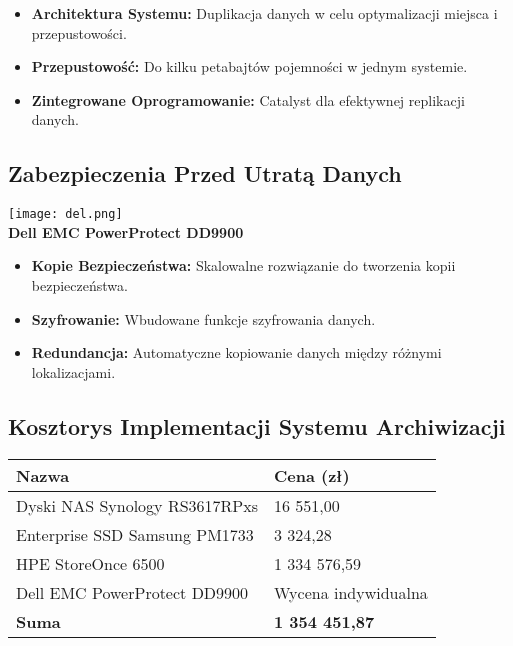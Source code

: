             \begin{itemize}
                \item \textbf{Architektura Systemu:} Duplikacja danych w celu optymalizacji miejsca i przepustowości.
                \item \textbf{Przepustowość:} Do kilku petabajtów pojemności w jednym systemie.
                \item \textbf{Zintegrowane Oprogramowanie:} Catalyst dla efektywnej replikacji danych.
            \end{itemize}

    \subsection{Zabezpieczenia Przed Utratą Danych}

            \texttt{[image: del.png]}\\
            \textbf{Dell EMC PowerProtect DD9900}\\
            \begin{itemize}
                \item \textbf{Kopie Bezpieczeństwa:} Skalowalne rozwiązanie do tworzenia kopii bezpieczeństwa.
                \item \textbf{Szyfrowanie:} Wbudowane funkcje szyfrowania danych.
                \item \textbf{Redundancja:} Automatyczne kopiowanie danych między różnymi lokalizacjami.
            \end{itemize}

    \subsection{Kosztorys Implementacji Systemu Archiwizacji}
    \begin{flushleft}
        \begin{table}[h]
            \renewcommand{\arraystretch}{1.5}
            \begin{tabular}{|l|l|}
                \hline
                \textbf{Nazwa} & \textbf{Cena (zł)} \\
                \hline
                Dyski NAS Synology RS3617RPxs & 16 551,00 \\
                Enterprise SSD Samsung PM1733 & 3 324,28 \\
                HPE StoreOnce 6500 & 1 334 576,59 \\
                Dell EMC PowerProtect DD9900 & Wycena indywidualna \\
                \hline
                \textbf{Suma} & \textbf{1 354 451,87} \\
                \hline
            \end{tabular}
        \end{table}
    \end{flushleft}



